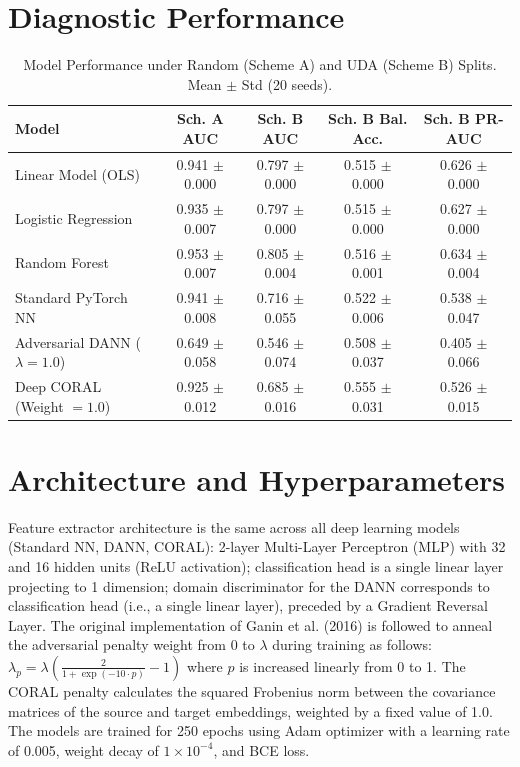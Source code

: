 \documentclass{article}
\begin{document}
\appendix
\label{sec:appendix}

\section{Diagnostic Performance} \label{sec:diagnostic}
\begin{table}[H]\footnotesize
\centering
\caption{Model Performance under Random (Scheme A) and UDA (Scheme B) Splits. Mean $\pm$ Std (20 seeds).}
\label{tab:main}
\begin{tabular}{lcccc}
\toprule
Model & Sch. A AUC & Sch. B AUC & Sch. B Bal. Acc. & Sch. B PR-AUC \\
\midrule
Linear Model (OLS) & 0.941 $\pm$ 0.000 & 0.797 $\pm$ 0.000 & 0.515 $\pm$ 0.000 & 0.626 $\pm$ 0.000 \\
Logistic Regression & 0.935 $\pm$ 0.007 & 0.797 $\pm$ 0.000 & 0.515 $\pm$ 0.000 & 0.627 $\pm$ 0.000 \\
Random Forest & 0.953 $\pm$ 0.007 & 0.805 $\pm$ 0.004 & 0.516 $\pm$ 0.001 & 0.634 $\pm$ 0.004 \\
Standard PyTorch NN & 0.941 $\pm$ 0.008 & 0.716 $\pm$ 0.055 & 0.522 $\pm$ 0.006 & 0.538 $\pm$ 0.047 \\
Adversarial DANN ($\lambda=1.0$) & 0.649 $\pm$ 0.058 & 0.546 $\pm$ 0.074 & 0.508 $\pm$ 0.037 & 0.405 $\pm$ 0.066 \\
Deep CORAL (Weight $= 1.0$) & 0.925 $\pm$ 0.012 & 0.685 $\pm$ 0.016 & 0.555 $\pm$ 0.031 & 0.526 $\pm$ 0.015 \\
\bottomrule
\end{tabular}
\end{table}
\section{Architecture and Hyperparameters} \label{sec:appendix}
Feature extractor architecture is the same across all deep learning models (Standard NN, DANN, CORAL): 2-layer Multi-Layer Perceptron (MLP) with 32 and 16 hidden units (ReLU activation); classification head is a single linear layer projecting to 1 dimension; domain discriminator for the DANN corresponds to classification head (i.e., a single linear layer), preceded by a Gradient Reversal Layer. The original implementation of Ganin et al. (2016) is followed to anneal the adversarial penalty weight from 0 to $\lambda$ during training as follows: $\lambda_p = \lambda \left(\frac{2}{1+\exp(-10\cdot p)} - 1\right)$ where $p$ is increased linearly from 0 to 1. The CORAL penalty calculates the squared Frobenius norm between the covariance matrices of the source and target embeddings, weighted by a fixed value of 1.0. The models are trained for 250 epochs using Adam optimizer with a learning rate of 0.005, weight decay of $1 \times 10^{-4}$, and BCE loss.
\end{document}
